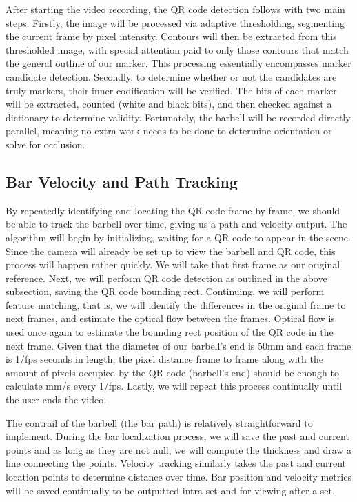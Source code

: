 \documentclass[10pt,twocolumn]{article}
\begin{document}
After starting the video recording, the QR code detection follows with two main steps.
Firstly, the image will be processed via adaptive thresholding, segmenting the current frame by pixel intensity.
Contours will then be extracted from this thresholded image, with special attention paid to only those contours that match the general outline of our marker.
This processing essentially encompasses marker candidate detection.
Secondly, to determine whether or not the candidates are truly markers, their inner codification will be verified.
The bits of each marker will be extracted, counted (white and black bits), and then checked against a dictionary to determine validity.
Fortunately, the barbell will be recorded directly parallel, meaning no extra work needs to be done to determine orientation or solve for occlusion. \par

\subsection{Bar Velocity and Path Tracking}
By repeatedly identifying and locating the QR code frame-by-frame, we should be able to track the barbell over time, giving us a path and velocity output. 
The algorithm will begin by initializing, waiting for a QR code to appear in the scene.
Since the camera will already be set up to view the barbell and QR code, this process will happen rather quickly.
We will take that first frame as our original reference.
Next, we will perform QR code detection as outlined in the above subsection, saving the QR code bounding rect.
Continuing, we will perform feature matching, that is, we will identify the differences in the original frame to next frames, and estimate the optical flow between the frames.
Optical flow is used once again to estimate the bounding rect position of the QR code in the next frame.
Given that the diameter of our barbell's end is 50mm and each frame is 1/fps seconds in length, the pixel distance frame to frame along with the amount of pixels occupied by the QR code (barbell's end) should be enough to calculate mm/s every 1/fps.
Lastly, we will repeat this process continually until the user ends the video. \par

The contrail of the barbell (the bar path) is relatively straightforward to implement.
During the bar localization process, we will save the past and current points and as long as they are not null, we will compute the thickness and draw a line connecting the points.
Velocity tracking similarly takes the past and current location points to determine distance over time.
Bar position and velocity metrics will be saved continually to be outputted intra-set and for viewing after a set. \par
\end{document}

